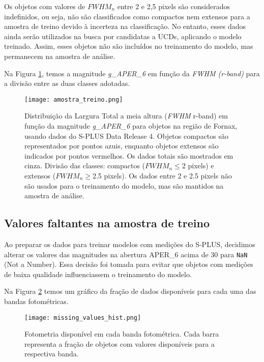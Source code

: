 Os objetos com valores de $\textit{FWHM}_n$ entre 2 e 2,5 pixels são considerados indefinidos, ou seja, não são classificados como compactos nem extensos para a amostra de treino devido à incerteza na classificação. No entanto, esses dados ainda serão utilizados na busca por candidatas a UCDs, aplicando o modelo treinado. Assim, esses objetos não são incluídos no treinamento do modelo, mas permanecem na amostra de análise.

Na Figura \ref{amostra_treino}, temos a magnitude \textit{g\_APER\_6} em função da \textit{FWHM (r-band)} para a divisão entre as duas classes adotadas.

\begin{figure}[!ht]
    \centering
    \texttt{[image: amostra\_treino.png]}
    \caption[]{Distribuição da Largura Total a meia altura (\textit{FWHM} r-band) em função da magnitude \textit{g\_APER\_6} para objetos na região de Fornax, usando dados do S-PLUS Data Release 4. Objetos compactos são representados por pontos azuis, enquanto objetos extensos são indicados por pontos vermelhos. Os dados totais são mostrados em cinza. Divisão das classes: compactos ($\textit{FWHM}_n$$\leq$2 pixels) e extensos ($\textit{FWHM}_n$$\geq$2.5 pixels). Os dados entre 2 e 2.5 pixels não são usados para o treinamento do modelo, mas são mantidos na amostra de análise.}
    \label{amostra_treino}
\end{figure}

\subsection{Valores faltantes na amostra de treino}\label{subsec:valores_faltantes}
Ao preparar os dados para treinar modelos com medições do S-PLUS, decidimos alterar os valores das magnitudes na abertura APER\_6 acima de 30 para \texttt{NaN} (Not a Number). Essa decisão foi tomada para evitar que objetos com medições de baixa qualidade influenciassem o treinamento do modelo.

Na Figura \ref{missing_values_hist} temos um gráfico da fração de dados disponíveis para cada uma das bandas fotométricas.

\begin{figure}[!ht]
    \begin{center}
    \texttt{[image: missing\_values\_hist.png]}
    \caption[]{Fotometria disponível em cada banda fotométrica. Cada barra representa a fração de objetos com valores disponíveis para a respectiva banda.}
    \label{missing_values_hist}
    \end{center}
\end{figure}

